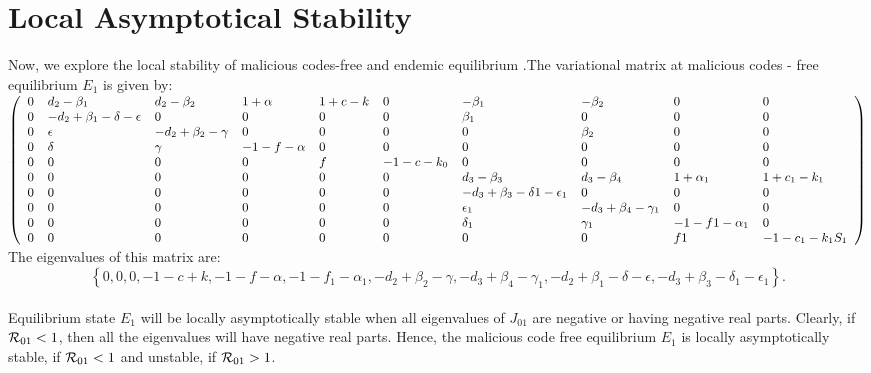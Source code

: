 \documentclass[preprint]{elsarticle}
\begin{document}
\section{Local Asymptotical Stability}


Now, we explore the local stability of malicious codes-free and endemic equilibrium .The variational matrix
at malicious codes - free equilibrium $E_1$ is given by:
\\

\begin{math}
\small\left(
        \begin{array}{llllllllll}
          0 & d_{2} - \beta_{1} & d_{2} - \beta_{2} & 1 + \alpha & 1 + c -k & 0 & - \beta_{1} & - \beta_{2} & 0 & 0 \\
          0 & -d_{2}+\beta_{1}-\delta-\epsilon & 0 & 0 & 0 & 0  & \beta_{1} & 0 & 0 & 0\\
          0 & \epsilon & -d_{2}+\beta_{2}-\gamma & 0 & 0 & 0 & 0 & \beta_{2} & 0 & 0 \\
          0 & \delta & \gamma & -1-f-\alpha & 0 & 0 & 0 & 0 & 0 & 0 \\
          0 & 0 & 0 & 0 & f & - 1 - c - k_{0} & 0 & 0 & 0 & 0 \\
          0 & 0 & 0 & 0 & 0 & 0 & d_{3} - \beta_{3} & d_{3} - \beta_{4} & 1 + \alpha_{1} & 1 + c_{1} - k_{1} \\
          0 & 0 & 0 & 0 & 0 & 0 & -d_{3} + \beta_{3} - \delta{1} - \epsilon_{1} & 0 & 0 & 0 \\
          0 & 0 & 0 & 0 & 0 & 0 & \epsilon_{1} & -d_{3} + \beta_{4} - \gamma_{1} & 0 & 0  \\
          0 & 0 & 0 & 0 & 0 & 0 & \delta_{1} & \gamma_{1} & -1 - f{1} - \alpha_{1} & 0  \\
          0 & 0 & 0 & 0 & 0 & 0 & 0 & 0 & f{1} & - 1 - c_{1} - k_{1} S_{1}  \\
        \end{array}
      \right)\normalsize
\end{math}
\\
The eigenvalues of this matrix are:
\tiny\[
\left\{
0,0,0,-1-c+k,-1-f-\alpha,-1-f_{1}-\alpha_{1},-d_{2}+\beta_{2}-\gamma,-d_{3}+\beta_{4}-\gamma_{1},-d_{2}+\beta_{1}-\delta-\epsilon,
-d_{3}+\beta_{3}-\delta_{1}-\epsilon_{1}
\right\}.
\]
\normalsize
\\
Equilibrium state $E_1$ will be locally asymptotically stable when all  eigenvalues of $J_ {01} $ are negative or having negative real parts.
Clearly, if ${{\cal R}}_{01} < 1$, then all the eigenvalues will have negative real parts. Hence, the malicious code free equilibrium $E_1$ is locally asymptotically stable, if ${{\cal R}}_{01} < 1$ and unstable, if ${{\cal R}}_{01} > 1$. \\
\end{document}
